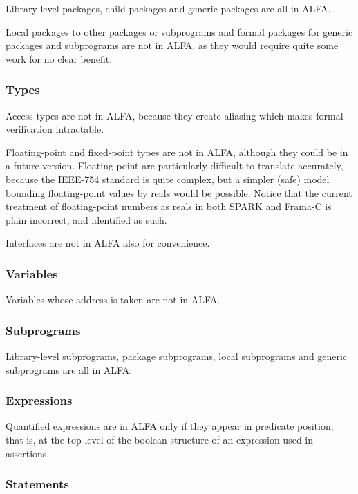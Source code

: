 \documentclass{article}
\begin{document}
Library-level packages, child packages and generic packages are all in ALFA.

Local packages to other packages or subprograms and formal packages for generic
packages and subprograms are not in ALFA, as they would require quite some work
for no clear benefit.

\subsubsection{Types}

Access types are not in ALFA, because they create aliasing which makes formal
verification intractable.

Floating-point and fixed-point types are not in ALFA, although they could be in
a future version. Floating-point are particularly difficult to translate
accurately, because the IEEE-754 standard is quite complex, but a simpler
(safe) model bounding floating-point values by reals would be possible. Notice
that the current treatment of floating-point numbers as reals in both SPARK and
Frama-C is plain incorrect, and identified as such.

Interfaces are not in ALFA also for convenience.

\subsubsection{Variables}

Variables whose address is taken are not in ALFA.

\subsubsection{Subprograms}

Library-level subprograms, package subprograms, local subprograms and generic
subprograms are all in ALFA.

\subsubsection{Expressions}

Quantified expressions are in ALFA only if they appear in predicate position,
that is, at the top-level of the boolean structure of an expression used in
assertions.

\subsubsection{Statements}
\end{document}
